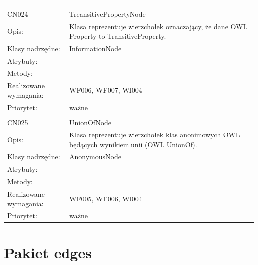 \documentclass[a4paper,10pt]{article}
\begin{document}
\begin{center}
\begin{longtable}{|m{3cm}|m{9cm}|}
\multicolumn{2}{c}{} \\
 \hline

CN024 & TreansitivePropertyNode \\ \hline
Opis: & Klasa reprezentuje wierzchołek oznaczający, że dane OWL Property to TransitiveProperty.    \\ \hline
Klasy nadrzędne: & InformationNode     \\ \hline
Atrybuty: & %
 \\ \hline
Metody: & %
  \\ \hline
Realizowane wymagania: & WF006, WF007, WI004 \\ \hline
Priorytet: & ważne  \\ \hline

\multicolumn{2}{c}{} \\
 \hline

CN025 & UnionOfNode \\ \hline
Opis: & Klasa reprezentuje wierzchołek klas anonimowych OWL będących wynikiem unii (OWL UnionOf).    \\ \hline
Klasy nadrzędne: & AnonymousNode     \\ \hline
Atrybuty: & %
 \\ \hline
Metody: & %
  \\ \hline
Realizowane wymagania: & WF005, WF006, WI004 \\ \hline
Priorytet: & ważne  \\ \hline



\end{longtable}

\end{center}

\section{Pakiet edges}
\end{document}
